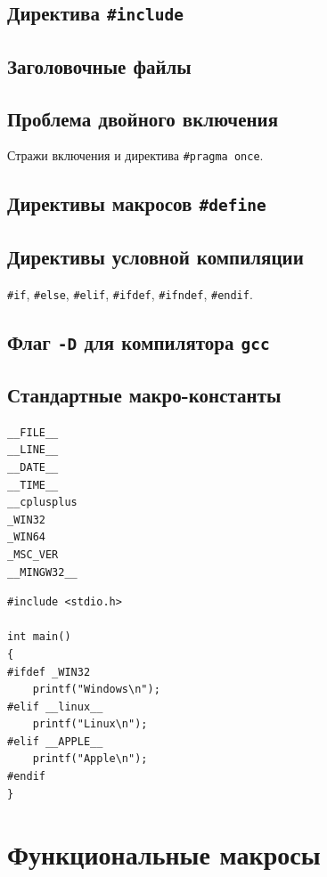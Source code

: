 \documentclass{article}
\begin{document}
\subsection*{Директива \texttt{\#include}}

\subsection*{Заголовочные файлы}

\subsection*{Проблема двойного включения}
Стражи включения и директива \texttt{\#pragma once}.

\subsection*{Директивы макросов \texttt{\#define}}

\subsection*{Директивы условной компиляции}
\texttt{\#if}, \texttt{\#else}, \texttt{\#elif}, 
\texttt{\#ifdef}, \texttt{\#ifndef}, \texttt{\#endif}.


\subsection*{Флаг \texttt{-D} для компилятора \texttt{gcc}}

\subsection*{Стандартные макро-константы}
\begin{verbatim}
__FILE__
__LINE__
__DATE__
__TIME__
__cplusplus
_WIN32
_WIN64
_MSC_VER
__MINGW32__
\end{verbatim}

\begin{lstlisting}
#include <stdio.h>

int main()
{
#ifdef _WIN32
    printf("Windows\n");
#elif __linux__
    printf("Linux\n");
#elif __APPLE__
    printf("Apple\n");
#endif
}
\end{lstlisting}


\newpage
\section*{Функциональные макросы}
\end{document}
